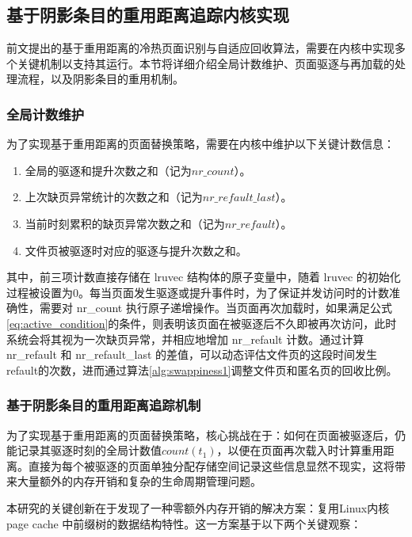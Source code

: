 \subsection{基于阴影条目的重用距离追踪内核实现}
\label{sec:shadow_entry_impl}

前文提出的基于重用距离的冷热页面识别与自适应回收算法，需要在内核中实现多个关键机制以支持其运行。本节将详细介绍全局计数维护、页面驱逐与再加载的处理流程，以及阴影条目的重用机制。

\subsubsection{全局计数维护}

为了实现基于重用距离的页面替换策略，需要在内核中维护以下关键计数信息：

\begin{enumerate}
  \item 全局的驱逐和提升次数之和（记为\(nr\_count\)）。
  \item 上次缺页异常统计的次数之和（记为\(nr\_refault\_last\)）。
  \item 当前时刻累积的缺页异常次数之和（记为\(nr\_refault\)）。
  \item 文件页被驱逐时对应的驱逐与提升次数之和。
\end{enumerate}

其中，前三项计数直接存储在 lruvec 结构体的原子变量中，随着 lruvec 的初始化过程被设置为0。每当页面发生驱逐或提升事件时，为了保证并发访问时的计数准确性，需要对 nr\_count 执行原子递增操作。当页面再次加载时，如果满足公式\ref{eq:active_condition}的条件，则表明该页面在被驱逐后不久即被再次访问，此时系统会将其视为一次缺页异常，并相应地增加 nr\_refault 计数。通过计算 nr\_refault 和 nr\_refault\_last 的差值，可以动态评估文件页的这段时间发生refault的次数，进而通过算法\ref{alg:swappiness1}调整文件页和匿名页的回收比例。

\subsubsection{基于阴影条目的重用距离追踪机制}
\label{sec:shadow_entry}
为了实现基于重用距离的页面替换策略，核心挑战在于：如何在页面被驱逐后，仍能记录其驱逐时刻的全局计数值\(count(t_1)\)，以便在页面再次载入时计算重用距离。直接为每个被驱逐的页面单独分配存储空间记录这些信息显然不现实，这将带来大量额外的内存开销和复杂的生命周期管理问题。

本研究的关键创新在于发现了一种零额外内存开销的解决方案：复用Linux内核 page cache 中前缀树的数据结构特性。这一方案基于以下两个关键观察：

